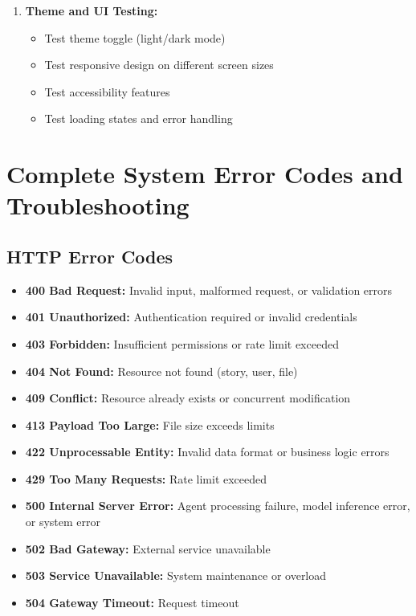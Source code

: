 {\begin{enumerate}
    \item \textbf{Theme and UI Testing:}
    \begin{itemize}
        \item Test theme toggle (light/dark mode)
        \item Test responsive design on different screen sizes
        \item Test accessibility features
        \item Test loading states and error handling
    \end{itemize}
\end{enumerate}

\section{Complete System Error Codes and Troubleshooting}

\subsection{HTTP Error Codes}
\begin{itemize}
    \item \textbf{400 Bad Request:} Invalid input, malformed request, or validation errors
    \item \textbf{401 Unauthorized:} Authentication required or invalid credentials
    \item \textbf{403 Forbidden:} Insufficient permissions or rate limit exceeded
    \item \textbf{404 Not Found:} Resource not found (story, user, file)
    \item \textbf{409 Conflict:} Resource already exists or concurrent modification
    \item \textbf{413 Payload Too Large:} File size exceeds limits
    \item \textbf{422 Unprocessable Entity:} Invalid data format or business logic errors
    \item \textbf{429 Too Many Requests:} Rate limit exceeded
    \item \textbf{500 Internal Server Error:} Agent processing failure, model inference error, or system error
    \item \textbf{502 Bad Gateway:} External service unavailable
    \item \textbf{503 Service Unavailable:} System maintenance or overload
    \item \textbf{504 Gateway Timeout:} Request timeout
\end{itemize}

}
